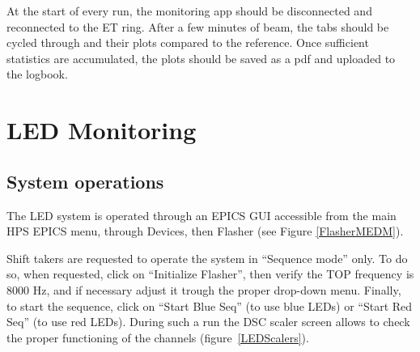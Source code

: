 \documentclass[12pt]{article}
\begin{document}
At the start of every run, the monitoring app should be disconnected and reconnected to the ET ring.  After a few minutes of beam, the tabs should be cycled through and their plots compared to the reference.  Once sufficient statistics are accumulated, the plots should be saved as a pdf and uploaded to the logbook.

\newpage
\iffalse
   \section{LED Monitoring}
      \subsection{System operations}
      The LED system is operated through an EPICS GUI accessible from the main HPS EPICS menu, through Devices, then Flasher (see Figure \ref{FlasherMEDM}).

Shift takers are requested to operate the system in ``Sequence mode'' only. To do so, when requested, click on ``Initialize Flasher'', then verify the TOP frequency is 8000 Hz, and if necessary adjust it trough the proper drop-down menu. Finally, to start the sequence, click on ``Start Blue Seq'' (to use blue LEDs) or ``Start Red Seq'' (to use red LEDs). During such a run the DSC scaler screen allows to check the proper functioning of the channels (figure~\ref{LEDScalers}). 
\end{document}
